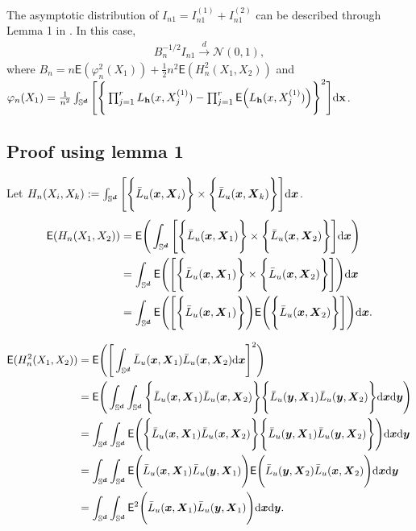 \documentclass{article}
\begin{document}
The asymptotic distribution of $I_{n1} = I_{n1}^{(1)} + I_{n1}^{(2)}$ can be described through Lemma 1 in \cite{Garc_a_Portugu_es_2015}. In this case,
\begin{align}
    B_n^{-1/2} I_{n1} \xrightarrow{d} \mathcal{N}(0, 1),
\end{align}
where $B_n = n \mathsf{E} (\varphi_n^2(X_1)) + \frac{1}{2} n^2 \mathsf{E}(H_n^2(X_1,X_2))$ and $\varphi_n(X_1) = \frac{1}{n^2} \int_{\mathbb{S}^{\boldsymbol{d}}} \Bigg[ \Bigg\{ \prod_{j=1}^{r} L_{\mathbf{h}} (x,X_j^{(1)}) - \prod_{j=1}^{r} \mathsf{E} \Big( L_{\mathbf{h}} (x,X_j^{(1)}) \Big) \Bigg\}^2 \Bigg] \mathrm{d} \mathbf{x}$.

\subsection{Proof using lemma 1}

Let $H_n(X_i,X_k) := \int_{\mathbb{S}^{\boldsymbol{d}}} \Bigg[ \Bigg\{ \bar{L}_u (\boldsymbol{x},\boldsymbol{X}_i) \Bigg\} \times \Bigg\{ \bar{L}_u (\boldsymbol{x},\boldsymbol{X}_k) \Bigg\} \Bigg] \mathrm{d} \boldsymbol{x}$.
\begin{align*}
    \mathsf{E} (H_n(X_1,X_2)) &= \mathsf{E} \Bigg( \int_{\mathbb{S}^{\boldsymbol{d}}} \Bigg[ \Bigg\{ \bar{L}_u (\boldsymbol{x},\boldsymbol{X}_1) \Bigg\} \times \Bigg\{ \bar{L}_u (\boldsymbol{x},\boldsymbol{X}_2) \Bigg\} \Bigg] \mathrm{d} \boldsymbol{x} \Bigg) \\
    &= \int_{\mathbb{S}^{\boldsymbol{d}}} \mathsf{E} \Bigg( \Bigg[ \Bigg\{ \bar{L}_u (\boldsymbol{x},\boldsymbol{X}_1) \Bigg\} \times \Bigg\{ \bar{L}_u (\boldsymbol{x},\boldsymbol{X}_2) \Bigg\} \Bigg] \Bigg) \mathrm{d} \boldsymbol{x} \\
    &= \int_{\mathbb{S}^{\boldsymbol{d}}} \mathsf{E} \Bigg( \Bigg[ \Bigg\{ \bar{L}_u (\boldsymbol{x},\boldsymbol{X}_1) \Bigg\} \Bigg) \mathsf{E} \Bigg( \Bigg\{ \bar{L}_u (\boldsymbol{x},\boldsymbol{X}_2) \Bigg\} \Bigg] \Bigg) \mathrm{d} \boldsymbol{x}.
\end{align*}

\begin{align*}
    \mathsf{E} (H_n^2(X_1,X_2)) &= \mathsf{E} \Bigg( \Bigg[  \int_{\mathbb{S}^{\boldsymbol{d}}} \bar{L}_u (\boldsymbol{x},\boldsymbol{X}_1) \bar{L}_u (\boldsymbol{x},\boldsymbol{X}_2) \mathrm{d} \boldsymbol{x} \Bigg]^2 \Bigg) \\
    &= \mathsf{E} \Bigg(  \int_{\mathbb{S}^{\boldsymbol{d}}} \int_{\mathbb{S}^{\boldsymbol{d}}} \Bigg\{ \bar{L}_u (\boldsymbol{x},\boldsymbol{X}_1) \bar{L}_u (\boldsymbol{x},\boldsymbol{X}_2) \Bigg\} \Bigg\{ \bar{L}_u (\boldsymbol{y},\boldsymbol{X}_1) \bar{L}_u (\boldsymbol{y},\boldsymbol{X}_2) \Bigg\}  \mathrm{d} \boldsymbol{x} \mathrm{d} \boldsymbol{y} \Bigg) \\
    &= \int_{\mathbb{S}^{\boldsymbol{d}}} \int_{\mathbb{S}^{\boldsymbol{d}}} \mathsf{E} \Bigg( \Bigg\{ \bar{L}_u (\boldsymbol{x},\boldsymbol{X}_1) \bar{L}_u (\boldsymbol{x},\boldsymbol{X}_2) \Bigg\} \Bigg\{ \bar{L}_u (\boldsymbol{y},\boldsymbol{X}_1) \bar{L}_u (\boldsymbol{y},\boldsymbol{X}_2) \Bigg\} \Bigg) \mathrm{d} \boldsymbol{x} \mathrm{d} \boldsymbol{y} \\
    &= \int_{\mathbb{S}^{\boldsymbol{d}}} \int_{\mathbb{S}^{\boldsymbol{d}}} \mathsf{E} \Bigg( \bar{L}_u (\boldsymbol{x},\boldsymbol{X}_1) \bar{L}_u (\boldsymbol{y},\boldsymbol{X}_1) \Bigg) \mathsf{E} \Bigg( \bar{L}_u (\boldsymbol{y},\boldsymbol{X}_2) \bar{L}_u (\boldsymbol{x},\boldsymbol{X}_2) \Bigg) \mathrm{d} \boldsymbol{x} \mathrm{d} \boldsymbol{y} \\
    &= \int_{\mathbb{S}^{\boldsymbol{d}}} \int_{\mathbb{S}^{\boldsymbol{d}}} \mathsf{E}^2 \Bigg( \bar{L}_u (\boldsymbol{x},\boldsymbol{X}_1) \bar{L}_u (\boldsymbol{y},\boldsymbol{X}_1) \Bigg) \mathrm{d} \boldsymbol{x} \mathrm{d} \boldsymbol{y}.
\end{align*}
\end{document}
